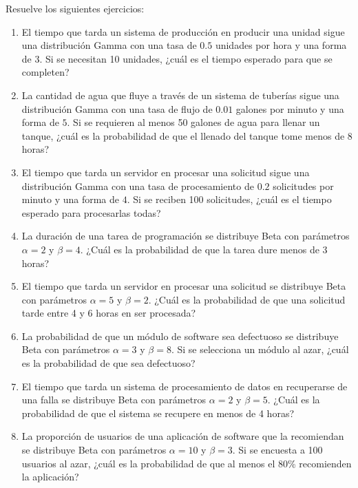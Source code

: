 \begin{Ejer}
Resuelve los siguientes ejercicios:
\begin{enumerate}


\item El tiempo que tarda un sistema de producción en producir una unidad sigue una distribución Gamma con una tasa de $0.5$ unidades por hora y una forma de $3$. Si se necesitan 10 unidades, ¿cuál es el tiempo esperado para que se completen?

\item La cantidad de agua que fluye a través de un sistema de tuberías sigue una distribución Gamma con una tasa de flujo de $0.01$ galones por minuto y una forma de $5$. Si se requieren al menos 50 galones de agua para llenar un tanque, ¿cuál es la probabilidad de que el llenado del tanque tome menos de 8 horas?

\item El tiempo que tarda un servidor en procesar una solicitud sigue una distribución Gamma con una tasa de procesamiento de $0.2$ solicitudes por minuto y una forma de $4$. Si se reciben 100 solicitudes, ¿cuál es el tiempo esperado para procesarlas todas?

\item La duración de una tarea de programación se distribuye Beta con parámetros $\alpha=2$ y $\beta=4$. ¿Cuál es la probabilidad de que la tarea dure menos de 3 horas?

\item El tiempo que tarda un servidor en procesar una solicitud se distribuye Beta con parámetros $\alpha=5$ y $\beta=2$. ¿Cuál es la probabilidad de que una solicitud tarde entre 4 y 6 horas en ser procesada?

\item La probabilidad de que un módulo de software sea defectuoso se distribuye Beta con parámetros $\alpha=3$ y $\beta=8$. Si se selecciona un módulo al azar, ¿cuál es la probabilidad de que sea defectuoso?

\item El tiempo que tarda un sistema de procesamiento de datos en recuperarse de una falla se distribuye Beta con parámetros $\alpha=2$ y $\beta=5$. ¿Cuál es la probabilidad de que el sistema se recupere en menos de 4 horas?

\item La proporción de usuarios de una aplicación de software que la recomiendan se distribuye Beta con parámetros $\alpha=10$ y $\beta=3$. Si se encuesta a 100 usuarios al azar, ¿cuál es la probabilidad de que al menos el 80\% recomienden la aplicación?


\end{enumerate}
\end{Ejer}
